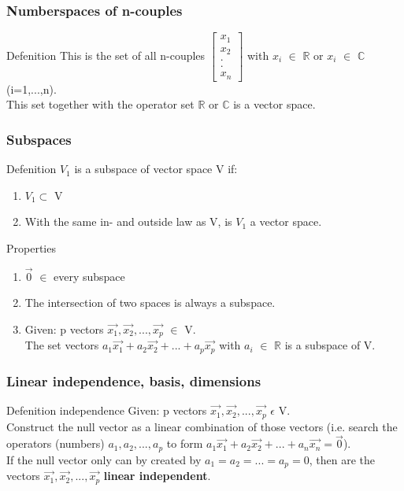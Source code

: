 \begin{frame}
	\frametitle{Numberspaces of n-couples}
	\begin{block}{Defenition}
		This is the set of all n-couples 
		$\begin{bmatrix}
			x_1\\
			x_2\\
			.\\
			.\\
			x_n
		\end{bmatrix}$ with $x_i$ $\in$ $\mathbb{R}$ or $x_i$ $\in$ $\mathbb{C}$ (i=1,...,n).\\
		This set together with the operator set $\mathbb{R}$ or $\mathbb{C}$ is a vector space.
	\end{block}
\end{frame}
		
\begin{frame}
	\frametitle{Subspaces}
	\begin{block}{Defenition}
		$V_1$ is a subspace of vector space V if:\\ 
		\begin{enumerate}
			\item $V_1 \subset$ V
			\item With the same in- and outside law as V, is $V_1$ a vector space.
		\end{enumerate}
	\end{block}
	\begin{block}{Properties}
		\begin{enumerate}
			\item $\overrightarrow{0}$ $\in$ every subspace
			\item The intersection of two spaces is always a subspace.
			\item Given: p vectors $\overrightarrow{x_1},\overrightarrow{x_2},...,\overrightarrow{x_p}$ $\in$ V.\\
			The set vectors $a_1\overrightarrow{x_1}+a_2\overrightarrow{x_2}+...+a_p\overrightarrow{x_p}$ with $a_i$ $\in$ $\mathbb{R}$ is a subspace of V.
		\end{enumerate}
	\end{block}
\end{frame}

\begin{frame}
	\frametitle{Linear independence, basis, dimensions}
	\begin{block}{Defenition independence}
		Given: p vectors $\overrightarrow{x_1},\overrightarrow{x_2},...,\overrightarrow{x_p}$ $\epsilon$ V.\\
		Construct the null vector as a linear combination of those vectors (i.e. search the operators (numbers) $a_1,a_2,...,a_p$ to form $a_1\overrightarrow{x_1}+a_2\overrightarrow{x_2}+...+a_n\overrightarrow{x_n}=\overrightarrow{0}$).\\
		If the null vector only can by created by $a_1=a_2=...=a_p=0$, then are the vectors $\overrightarrow{x_1},\overrightarrow{x_2},...,\overrightarrow{x_p}$ {\bf linear independent}.
	\end{block}
\end{frame}


